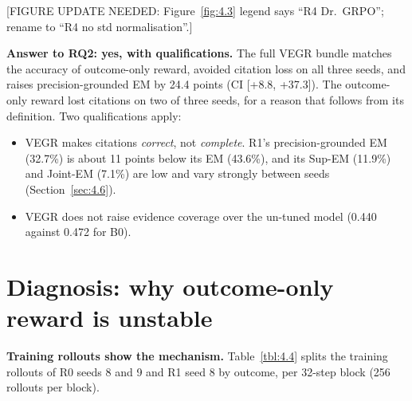 {[}FIGURE UPDATE NEEDED: Figure~\ref{fig:4.3} legend says ``R4
Dr.~GRPO''; rename to ``R4 no std normalisation''.{]}

\textbf{Answer to RQ2: yes, with qualifications.} The full VEGR bundle
matches the accuracy of outcome-only reward, avoided citation loss on
all three seeds, and raises precision-grounded EM by 24.4 points (CI
{[}+8.8, +37.3{]}). The outcome-only reward lost citations on two of
three seeds, for a reason that follows from its definition. Two
qualifications apply:

\begin{itemize}
\tightlist
\item
  VEGR makes citations \emph{correct}, not \emph{complete}. R1's
  precision-grounded EM (32.7\%) is about 11 points below its EM
  (43.6\%), and its Sup-EM (11.9\%) and Joint-EM (7.1\%) are low and
  vary strongly between seeds (Section~\ref{sec:4.6}).
\item
  VEGR does not raise evidence coverage over the un-tuned model (0.440
  against 0.472 for B0).
\end{itemize}

\section{Diagnosis: why outcome-only reward is unstable}\label{sec:4.5}

\textbf{Training rollouts show the mechanism.} Table~\ref{tbl:4.4}
splits the training rollouts of R0 seeds 8 and 9 and R1 seed 8 by
outcome, per 32-step block (256 rollouts per block).


